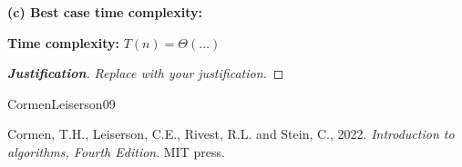 \documentclass[dvipsnames]{article}
\begin{document}
\begin{problem}
\textbf{(c) Best case time complexity:}

\begin{mdframed}
  \color{purple}
  \textbf{Time complexity:} $T(n) = \Theta(\ldots)$
  
  \begin{proof}[\textbf{Justification}]
    \emph{Replace with your justification.}
  \end{proof}
\end{mdframed}

\end{problem}

\begin{thebibliography}{CormenLeiserson09}

Cormen, T.H., Leiserson, C.E., Rivest, R.L. and Stein, C., 2022. \emph{Introduction to algorithms, Fourth Edition}. MIT press.

\end{thebibliography}
\end{document}
